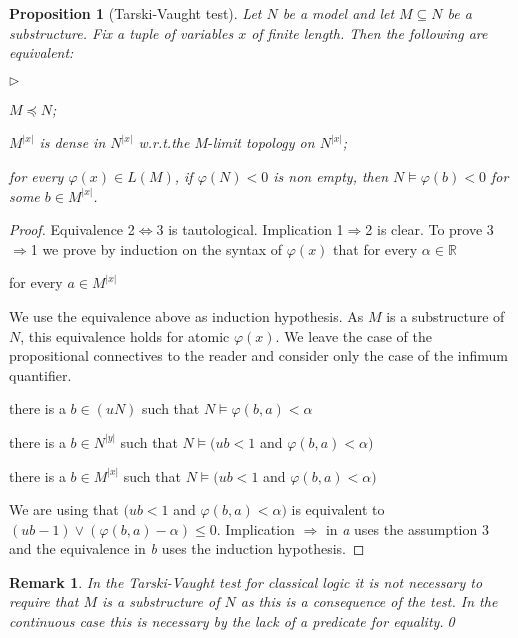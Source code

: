 \documentclass[12pt,letterpaper,oneside,reqno]{amsart}
\newcommand{\mylabel}[1]{{#1}\hfill}
\renewenvironment{itemize}
  {\begin{list}{$\triangleright$}{%
   \setlength{\parskip}{0mm}
   \setlength{\topsep}{.2\baselineskip}
   \setlength{\rightmargin}{0mm}
   \setlength{\listparindent}{0mm}
   \setlength{\itemindent}{0mm}
   \setlength{\labelwidth}{3ex}
   \setlength{\itemsep}{.2\baselineskip}
   \setlength{\parsep}{.2\baselineskip}
   \setlength{\partopsep}{0mm}
   \setlength{\labelsep}{1ex}
   \setlength{\leftmargin}{\labelwidth+\labelsep}
   \let\makelabel\mylabel}}{%
   \end{list}}
\theoremstyle{plain}
\newtheorem{proposition}[theorem]{Proposition}
\newtheorem{remark}[theorem]{Remark}
\theoremstyle{remark}
\begin{document}
\begin{proposition}[Tarski-Vaught test]\label{prop_Tarski-Vaught} Let $N$ be a model and let $M\subseteq N$ be a substructure. 
Fix a tuple of variables $x$ of finite length.
Then the following are equivalent:
\begin{itemize}
\item[1.] $M\preceq N$;
\item[2.] $M^{|x|}$ is dense in $N^{|x|}$ w.r.t.\@ the $M\mbox{-}$limit topology on $N^{|x|}$;
\item[3.] for every $\varphi(x)\in L(M)$, if $\varphi(N)<0$ is non empty, then $N\models\varphi(b)<0$ for some $b\in M^{|x|}$.
\end{itemize}
\end{proposition}
\begin{proof}
  Equivalence 2$\Leftrightarrow$3 is tautological.
  Implication 1$\Rightarrow$2 is clear.
  To prove 3$\Rightarrow$1 we prove by induction on the syntax of $\varphi(x)$ that for every $\alpha\in{\mathds R}$

   \hfill for every $a\in M^{|x|}$
  
  We use the equivalence above as induction hypothesis.
  As $M$ is a substructure of $N$, this equivalence holds for atomic $\varphi(x)$.
  We leave the case of the propositional connectives to the reader and consider only the case of the infimum quantifier.

   there is a $b\in(uN)$ such that $N\models\varphi(b,a)<\alpha$

  \ceq{}{\Leftrightarrow}{} there is a $b\in N^{|y|}$ such that $N\models (ub<1$ and $\varphi(b,a)<\alpha)$

   there is a $b\in M^{|x|}$ such that $N\models (ub<1$ and $\varphi(b,a)<\alpha)$


We are using that $(ub<1$ and $\varphi(b,a)<\alpha)$ is equivalent to $(ub-1)\vee(\varphi(b,a)-\alpha)\le0$.
Implication $\Rightarrow$ in \textit{a} uses the assumption 3 and the equivalence in \textit{b} uses the induction hypothesis.
\end{proof}

\begin{remark}
In the Tarski-Vaught test for classical logic it is not necessary to require that $M$ is a substructure of $N$ as this is a consequence of the test.
In the continuous case this is necessary by the lack of a predicate for equality.\qed
\end{remark}
\end{document}
